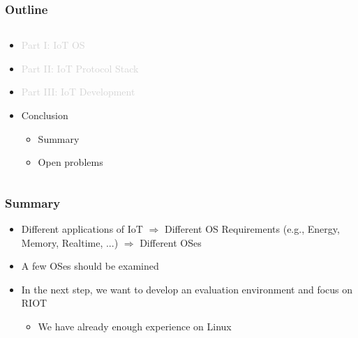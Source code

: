 \documentclass{beamer}
\begin{document}
\begin{frame}
	\frametitle{Outline}
	\begin{columns}[c]
		\begin{column}{30cm}
			\vspace{.1cm}
			\begin{itemize}
				\justifying
				\item \textcolor{LightGray}{Part I: IoT OS}
				\item \textcolor{LightGray}{Part II: IoT Protocol Stack}
				\item \textcolor{LightGray}{Part III: IoT Development}
				\item Conclusion
				\begin{itemize}
					\item Summary
					\item Open problems
				\end{itemize}				
			\end{itemize}
		\end{column}
	\end{columns}
\end{frame}

\begin{frame}
	\frametitle{Summary}
	\begin{itemize}
		\justifying
		\item Different applications of IoT $\Rightarrow$ Different OS Requirements (e.g., Energy, Memory, Realtime, ...) $\Rightarrow$ Different OSes
		\item A few OSes should be examined
		\item In the next step, we want to develop an evaluation environment and focus on RIOT 
		\begin{itemize}
			\item We have already enough experience on Linux 
		\end{itemize}
		\end{itemize}
\end{frame}
\end{document}
